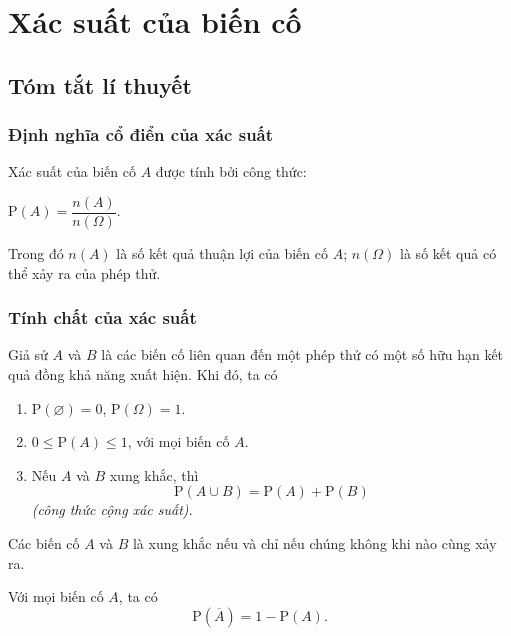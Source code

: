 \section{Xác suất của biến cố}

\subsection{Tóm tắt lí thuyết}

\subsubsection{Định nghĩa cổ điển của xác suất}
\begin{dn}
	Xác suất của biến cố $A$ được tính bởi công thức:
	\begin{center}
		$\mathrm{P}(A)=\dfrac{n(A)}{n(\Omega)}$.
	\end{center}
	Trong đó $n(A)$ là số kết quả thuận lợi của biến cố $A$; $n(\Omega)$ là số kết quả có thể xảy ra của phép thử.
\end{dn}

\subsubsection{Tính chất của xác suất}
	\begin{dl}
	Giả sử $A$ và $B$ là các biến cố liên quan đến một phép thử có một số hữu hạn kết quả đồng khả năng xuất hiện. Khi đó, ta có
	\begin{enumerate}
		\item $\mathrm{P}(\varnothing)=0$, $\mathrm{P}(\Omega)=1$.
		\item $0\le \mathrm{P}(A)\le 1$, với mọi biến cố $A$.
		\item Nếu $A$ và $B$ xung khắc, thì
		$$\mathrm{P}(A\cup B)=\mathrm{P}(A)+\mathrm{P}(B)$$
		\hfill \textit{(công thức cộng xác suất).}
	\end{enumerate}
\end{dl}
\begin{note}
	Các biến cố $A$ và $B$ là xung khắc nếu và chỉ nếu chúng không khi nào cùng xảy ra.
\end{note}

\begin{hq}
	Với mọi biến cố $A$, ta có 
	$$\mathrm{P}\left(\overline{A}\right)=1-\mathrm{P}(A).$$
\end{hq}


